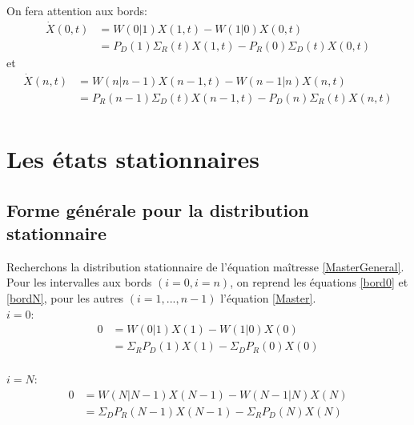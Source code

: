 On fera attention aux bords:
\begin{equation}
\begin{aligned}
\dot{X}(0,t) 	&= W(0|1) X(1,t) - W(1|0) X(0,t)\\
				&= P_D(1) \Sigma_R(t) X(1,t) - P_R(0) \Sigma_D(t) X(0,t)
\label{bord0}
\end{aligned}
\end{equation}
 et 
\begin{equation}
\begin{aligned}
\dot{X}(n,t) 	&= W(n|n-1) X(n-1,t) - W(n-1|n) X(n,t)\\
				&= P_R(n-1) \Sigma_D(t) X(n-1,t)- P_D(n) \Sigma_R(t) X(n,t)\\
\label{bordN}
\end{aligned}
\end{equation}


\section{Les états stationnaires}

\subsection{Forme générale pour la distribution stationnaire}
Recherchons la distribution stationnaire de l'équation maîtresse \ref{MasterGeneral}.\\

Pour les intervalles aux bords $(i=0,i=n)$, on reprend les équations \ref{bord0} et \ref{bordN}, pour les autres $(i=1,...,n-1)$ l'équation \ref{Master}.\\

$i=0$:
\begin{equation}
\begin{aligned}
0 &= W(0|1) X(1) - W(1|0) X(0)\\
  &= \Sigma_R P_D(1) X(1)- \Sigma_D P_R(0) X(0)\\
\label{statio_1}
\end{aligned}
\end{equation}

$i=N$:
\begin{equation}
\begin{aligned}
0 &= W(N|N-1) X(N-1) - W(N-1|N) X(N)\\
  &= \Sigma_D P_R(N-1)X(N-1)- \Sigma_R P_D(N) X(N)\\
 \label{statio_N}
\end{aligned}
\end{equation}

